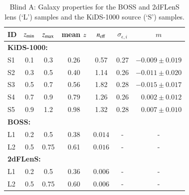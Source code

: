 \begin{appendix}
\begin{table}
\caption{Blind A: Galaxy properties for the BOSS and 2dFLenS lens (\lq L\rq) samples and the KiDS-1000 source (\lq S\rq) samples.}              %
\label{tab:datatab}      %
\centering                                      %
\begin{tabular}{lcccccr}          %
\hline\hline                        %
ID & $z_{\rm min}$ &  $z_{\rm max}$& mean $z$ & $n_{\rm eff}$ & $\sigma_{\epsilon,i}$ & \multicolumn{1}{c}{$m$}\\    %
\hline
\multicolumn{6}{l}{\bf KiDS-1000:}\\  
S1 & 0.1 & 0.3 & 0.26 & 0.57 &  0.27 & $-0.009\pm0.019$\\
S2 & 0.3 & 0.5 & 0.40 & 1.14 &  0.26 & $-0.011\pm0.020$\\
S3 & 0.5 & 0.7 & 0.56 & 1.82 &  0.28 & $-0.015\pm0.017$\\
S4 & 0.7 & 0.9 & 0.79 & 1.26 &  0.26 & $0.002\pm0.012$\\
S5 & 0.9 & 1.2 & 0.98 & 1.32 &  0.28 & $0.007\pm0.010$\\
\hline      
\multicolumn{6}{l}{\bf BOSS:}\\                             %
L1 & 0.2 & 0.5 & 0.38 & $0.014$ & -  & \multicolumn{1}{c}{-}\\
L2 & 0.5 & 0.75 & 0.61 & $0.016$ & -  & \multicolumn{1}{c}{-}\\
\hline      
\multicolumn{6}{l}{\bf 2dFLenS:}\\                                %
L1 & 0.2 & 0.5 & 0.36 & $0.006$ & - & \multicolumn{1}{c}{-}\\
L2 & 0.5 & 0.75 & 0.60 & $0.006$ & - & \multicolumn{1}{c}{-}\\
\hline
\end{tabular}
\end{table}


\end{appendix}
